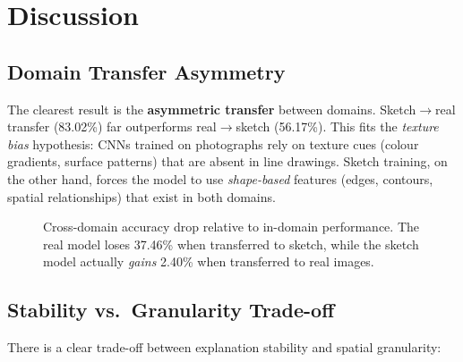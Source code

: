 \documentclass[12pt, a4paper]{article}
\begin{document}
\section{Discussion}
\label{sec:discussion}

\subsection{Domain Transfer Asymmetry}

The clearest result is the \textbf{asymmetric transfer} between domains.
Sketch$\to$real transfer (83.02\%) far outperforms real$\to$sketch (56.17\%).
This fits the \emph{texture bias} hypothesis: CNNs trained on photographs rely
on texture cues (colour gradients, surface patterns) that are absent in line
drawings.  Sketch training, on the other hand, forces the model to use
\emph{shape-based} features (edges, contours, spatial relationships) that exist
in both domains.

\begin{figure}[H]
\centering
{}
\caption{Cross-domain accuracy drop relative to in-domain performance.  The
real model loses 37.46\% when transferred to sketch, while the sketch model
actually \emph{gains} 2.40\% when transferred to real images.}
\label{fig:domain_drop}
\end{figure}

\subsection{Stability vs.\ Granularity Trade-off}

There is a clear trade-off between explanation stability and spatial
granularity:
\end{document}
